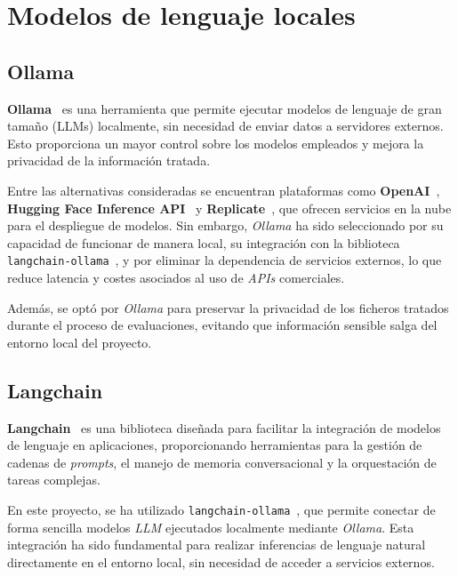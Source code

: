 \section{Modelos de lenguaje locales}

\subsection{Ollama}

\textbf{Ollama}~\cite{web:ollama} es una herramienta que permite ejecutar modelos de lenguaje de gran tamaño (LLMs) localmente, 
sin necesidad de enviar datos a servidores externos. Esto proporciona un mayor control sobre los modelos empleados y 
mejora la privacidad de la información tratada.

Entre las alternativas consideradas se encuentran plataformas como \textbf{OpenAI}~\cite{web:openai}, \textbf{Hugging Face Inference API}~\cite{web:huggingface} 
y \textbf{Replicate}~\cite{web:replicate}, que ofrecen servicios en la nube para el despliegue de modelos. Sin embargo, \textit{Ollama} ha sido seleccionado 
por su capacidad de funcionar de manera local, su integración con la biblioteca \texttt{langchain-ollama}~\cite{web:langchain-ollama}, y por 
eliminar la dependencia de servicios externos, lo que reduce latencia y costes asociados al uso de \textit{APIs} comerciales. 

Además, se optó por \textit{Ollama} para preservar la privacidad de los ficheros tratados durante el proceso de evaluaciones, evitando 
que información sensible salga del entorno local del proyecto.

\subsection{Langchain}

\textbf{Langchain}~\cite{web:langchain} es una biblioteca diseñada para facilitar la integración de modelos de lenguaje en aplicaciones, proporcionando herramientas para la gestión de cadenas de \textit{prompts}, el manejo de memoria conversacional y la orquestación de tareas complejas.

En este proyecto, se ha utilizado \texttt{langchain-ollama}~\cite{web:langchain-ollama}, que permite conectar de forma sencilla modelos \textit{LLM} ejecutados localmente mediante \textit{Ollama}. Esta integración ha sido fundamental para realizar inferencias de lenguaje natural directamente en el entorno local, sin necesidad de acceder a servicios externos.

